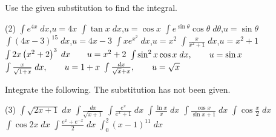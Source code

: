 \begin{Exercise}[title={Integration by Substitution},label=exIBS]
	\Question Use the given substitution to find the integral.
	\begin{tasks}(2)
		\task  $\int e^{4 x}\; d x$,\qquad $u =4 x$ %
		\task $\int \tan  x\; d x$,\qquad $u =\cos  x$ %
		\task $\int e^{\sin  \theta } \cos  \theta \; d \theta $,\qquad $u =\sin  \theta $ %
		\task $\int \left (4 x -3\right )^{15}\; d x$,\qquad $u =4 x -3$ %
		\task $\int x e^{x^{2}}\; d x$,\qquad $u =x^{2}$ %
		\task $\int \frac{x}{x^{2} +1}\; d x$,\qquad $u =x^{2} +1$ %
		\task $\int 2 x \left (x^{2} +2\right )^{3}\; d x \text{\quad \quad } u =x^{2} +2$ %
		\task $\int \sin ^{2} x \cos  x\; d x ,\text{\quad \quad }u =\sin  x$ %
		\task $\int \frac{x}{\sqrt{1 +x}}\; d x ,\text{\quad \quad }u =1 +x$ %
		\task $\int \frac{d x}{\sqrt{x} +x} ,\text{\quad \quad }u =\sqrt{x}$ %
	\end{tasks}
	
	\Question Integrate the following. The substitution has not been given.	\begin{tasks}(3)
		\task $\int \sqrt{2 x +1}\; d x$ %
		\task $\int \frac{d x}{\sqrt{x +1}}$ %
		\task $\int \frac{e^{x}}{e^{x} +1}\; d x$ %
		\task $\int \frac{\ln  x}{x}\; d x$ %
		\task $\int \frac{\cos  x}{\sin  x +1}\; d x$ %
		\task $\int \cos  \frac{x}{2}\; d x$ %
		\task $\int \cos  2 x\; d x$ %
		\task $\int \frac{e^{x} +e^{ -x}}{2}\; d x$ %
		\task $\int _{0}^{2}\left (x -1\right )^{11}\; d x$ %
	\end{tasks}


\end{Exercise}
